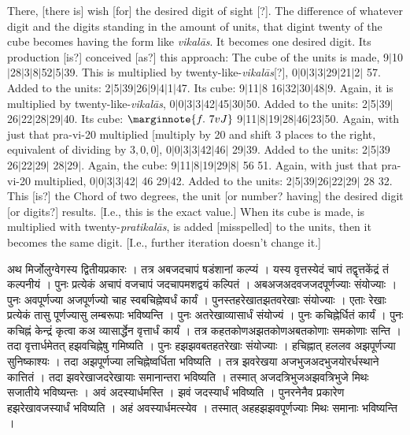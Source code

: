 \documentclass[11pt,a5paper]{book}
\def\pratikalas{\textit{prati\-ka\-l\=as}}
\def\vikalas{\textit{vi\-ka\-l\=as}}
\def\danda{$|$}
\begin{document}
{There, [there is] wish [for] the desired digit of sight [?].  The difference of whatever digit and the
digits standing in the amount of units, that digint twenty of the cube  becomes having the form like \vikalas. 
It becomes one desired digit. Its production [is?] conceived [as?] this approach: The cube of the 
units is made, 9\danda 10\danda 28\danda 3\danda 8\danda 52\danda 5\danda 39. 
This is multiplied by twenty-like-\vikalas [?], 0\danda 0\danda 3\danda 3\danda 29\danda 21\danda 2\danda
57. Added to the units: 2\danda 5\danda 39\danda 26\danda 9\danda 4\danda 1\danda 47.
Its cube: 9\danda 11\danda 8 16\danda 32\danda 30\danda 48\danda 9. Again, it is multiplied
by twenty-like-\vikalas, 0\danda 0\danda 3\danda 3\danda 42\danda 45\danda 30\danda 50.
Added to the units: 2\danda 5\danda 39\danda 26\danda 22\danda 28\danda 29\danda 40.
Its cube:
$\marginnote{f.~7v J} $
9\danda 11\danda 8\danda 19\danda 28\danda 46\danda 23\danda 50. 
Again, with just that pra-vi-20 multiplied [multiply by 20 and shift 3 places to the right, 
equivalent of dividing by $3,0,0$], 0\danda 0\danda 3\danda 3\danda 42\danda 46\danda
29\danda 39. Added to the units: 2\danda 5\danda 39 26\danda 22\danda 29\danda 
28\danda 29\danda. Again, the cube: 9\danda 11\danda 8\danda 19\danda 29\danda 8\danda
56 51. Again, with just that pra-vi-20 multiplied, 0\danda 0\danda 3\danda 3\danda 42\danda
46 29\danda 42. Added to the units: 2\danda 5\danda 39\danda 26\danda 22\danda 29\danda
28 32. This [is?] the Chord of two degrees, the unit [or number? having] the desired digit 
[or digits?] results. [I.e., this is the exact value.] 
When its cube is made, is multiplied with twenty-\pratikalas, is added [misspelled] to the units, then it
becomes the same digit. [I.e., further iteration doesn't change it.]

\newpage
{\s अथ मिर्जोलुग्वेगस्य द्वितीयप्रकारः । तत्र अबजदचापं षडंशानां कल्प्यं ।
यस्य वृत्तस्येदं चापं तद्वृत्तकेंद्रं तं कल्पनीयं । पुनः प्रत्येकं अचापं वजचापं जदचापमशद्वयं कल्पितं ।
अबअजअदवजजदपूर्णज्याः संयोज्याः । पुनः 
अवपूर्णज्या अजपूर्णज्यो चाह स्वबचिह्नेष्वर्धं कार्यं । पुनस्तहरेखातझतवरेखाः संयोज्याः । 
एताः रेखाः प्रत्येकं तासु पूर्णज्यासु लम्बरूपाः भविष्यन्ति । पुनः अतरेखाव्यासार्धं संयोज्यं । 
पुनः कचिह्नेर्धितं कार्यं । पुनः कचिह्नं केन्द्रं कृत्वा
कअ व्यासार्द्धेन वृत्तार्धं कार्यं । तत्र कहतकोणअझतकोणअबतकोणाः समकोणाः सन्ति । 
तदा वृत्तार्धमेतत् हझवचिह्नेषु गमिष्यति । पुनः हझझवबतहतरेखाः संयोज्याः । हचिह्नात् हललव अझपूर्णज्या सुनिष्काश्यः । 
तदा अझपूर्णज्या लचिह्नेष्वर्धिता भविष्यति । तत्र झवरेखया अजभुजअदभुजयोरर्धस्थाने कात्तितं । 
तदा झवरेखाजदरेखायाः समानान्तरा भविष्यति । तस्मात् अजदत्रिभुजअझवत्रिभुजे मिथः सजातीये भविष्यन्तः । अवं अदस्यार्धमस्ति ।  
झवं जदस्यार्धं भविष्यति । 
पुनरनेनैव प्रकारेण हझरेखावजस्यार्धं भविष्यति । अहं अवस्यार्धमत्स्येव । तस्मात् अहहझझवपूर्णज्याः मिथः समानाः भविष्यन्ति । }

}
\end{document}
